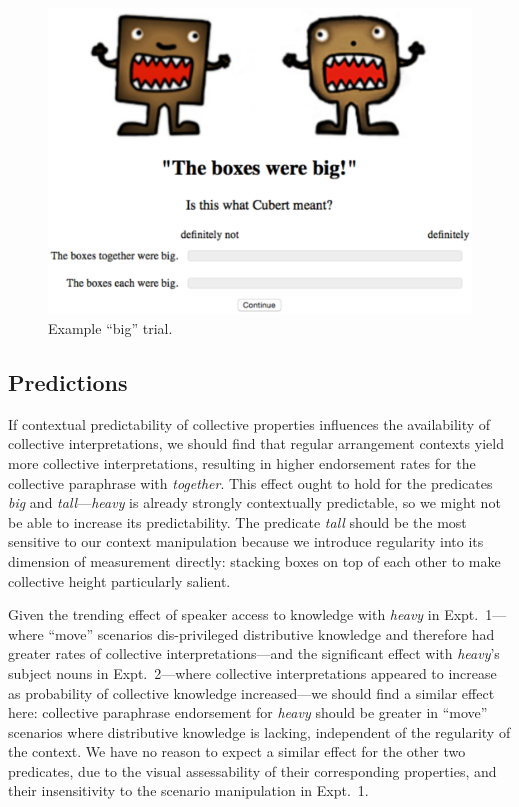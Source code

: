 \documentclass[linguex]{sp}
\begin{document}
\begin{figure}[h]
\centering
\includegraphics[width=4.5in]{images/trial.eps}
\caption{Example ``big'' trial.}\label{trial}
\end{figure}

\subsection{Predictions}

If contextual predictability of collective properties influences the availability of collective interpretations, we should find that regular arrangement contexts yield more collective interpretations, resulting in higher endorsement rates for the collective paraphrase with \emph{together}. This effect ought to hold for the predicates \emph{big} and \emph{tall}---\emph{heavy} is already strongly contextually predictable, so we might not be able to increase its predictability. The predicate \emph{tall} should be the most sensitive to our context manipulation because we introduce regularity into its dimension of measurement directly: stacking boxes on top of each other to make collective height particularly salient.

Given the trending effect of speaker access to knowledge with \emph{heavy} in Expt.~1---where ``move'' scenarios dis-privileged distributive knowledge and therefore had greater rates of collective interpretations---and the significant effect with \emph{heavy}'s subject nouns in Expt.~2---where collective interpretations appeared to increase as probability of collective knowledge increased---we should find a similar effect here: collective paraphrase endorsement for \emph{heavy} should be greater in ``move'' scenarios where distributive knowledge is lacking, independent of the regularity of the context. We have no reason to expect a similar effect for the other two predicates, due to the visual assessability of their corresponding properties, and their insensitivity to the scenario manipulation in Expt.~1.
\end{document}
